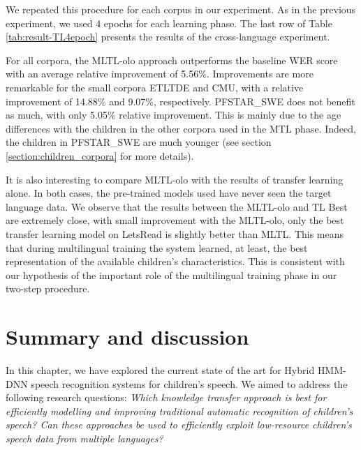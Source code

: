 We repeated this procedure for each corpus in our experiment. As in the previous experiment, we used 4 epochs for each learning phase. The last row of Table \ref{tab:result-TL4epoch} presents the results of the cross-language experiment.

For all corpora, the \ac{MLTL-olo} approach outperforms the baseline \ac{WER} score with an average relative improvement of 5.56\%. Improvements are more remarkable for the small corpora ETLTDE and CMU, with a relative improvement of 14.88\% and 9.07\%, respectively. PFSTAR\_SWE does not benefit as much, with only 5.05\% relative improvement. This is mainly due to the age differences with the children in the other corpora used in the \ac{MTL} phase. Indeed, the children in PFSTAR\_SWE are much younger (see section  \ref{section:children_corpora} for more details). %

It is also interesting to compare \ac{MLTL-olo} with the results of transfer learning alone. In both cases, the pre-trained models used have never seen the target language data. We observe that the results between the \ac{MLTL-olo} and \ac{TL} Best are extremely close, with small improvement with the \ac{MLTL-olo}, only the best transfer learning model on LetsRead is slightly better than \ac{MLTL}. This means that during multilingual training the system learned, at least, the best representation of the available children's characteristics. This is consistent with our hypothesis of the important role of the multilingual training phase in our two-step procedure.

\section{Summary and discussion}
In this chapter, we have explored the current state of the art for Hybrid \ac{HMM-DNN} speech recognition systems for children's speech. We aimed to address the following research questions: \textit{Which knowledge transfer approach is best for efficiently modelling and improving traditional automatic recognition of children's speech? Can these approaches be used to efficiently exploit low-resource children's speech data from multiple languages?}

